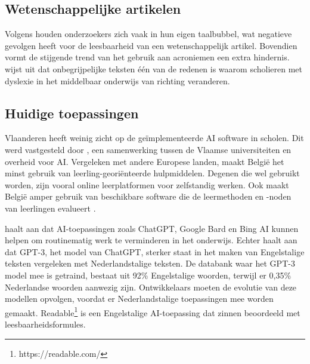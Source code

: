 
\subsection{Wetenschappelijke artikelen}

Volgens \textcite{PlavenSigray2017} houden onderzoekers zich vaak in hun eigen taalbubbel, wat negatieve gevolgen heeft voor de leesbaarheid van een wetenschappelijk artikel. Bovendien vormt de stijgende trend van het gebruik aan acroniemen \textcite{Barnett2020} een extra hindernis. \textcite{Donato2022} wijst uit dat onbegrijpelijke teksten één van de redenen is waarom scholieren met dyslexie in het middelbaar onderwijs van richting veranderen.

\subsection{Huidige toepassingen}

Vlaanderen heeft weinig zicht op de geïmplementeerde AI software in scholen. Dit werd vastgesteld door \autocite{Martens2021}, een samenwerking tussen de Vlaamse universiteiten en overheid voor AI. Vergeleken met andere Europese landen, maakt België het minst gebruik van leerling-georiënteerde hulpmiddelen. Degenen die wel gebruikt worden, zijn vooral online leerplatformen voor zelfstandig werken. Ook maakt België amper gebruik van beschikbare software die de leermethoden en -noden van leerlingen evalueert \autocite{Martens2021a}. 

\textcite{Verhoeven2023} haalt aan dat AI-toepassingen zoals ChatGPT, Google Bard en Bing AI kunnen helpen om routinematig werk te verminderen in het onderwijs. Echter haalt \textcite{Deckmyn2021} aan dat GPT-3, het model van ChatGPT, sterker staat in het maken van Engelstalige teksten vergeleken met Nederlandstalige teksten. De databank waar het GPT-3 model mee is getraind, bestaat uit 92\% Engelstalige woorden, terwijl er 0,35\% Nederlandse woorden aanwezig zijn. Ontwikkelaars moeten de evolutie van deze modellen opvolgen, voordat er Nederlandstalige toepassingen mee worden gemaakt. Readable\footnote{https://readable.com/} is een Engelstalige AI-toepassing dat zinnen beoordeeld met leesbaarheidsformules.

